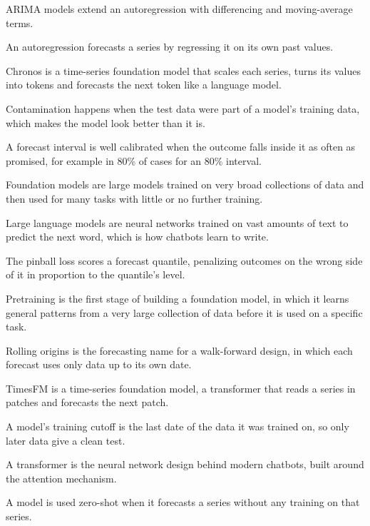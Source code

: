 \begin{keyterms}
\footnotesize
\begin{description}[leftmargin=0pt, itemsep=0pt, parsep=0pt, topsep=0pt, font=\normalfont\bfseries\color{FEMaroon}]
  \item[ARIMA.] ARIMA models extend an autoregression with differencing and moving-average terms.
  \item[Autoregression.] An autoregression forecasts a series by regressing it on its own past values.
  \item[Chronos.] Chronos is a time-series foundation model that scales each series, turns its values into tokens and forecasts the next token like a language model.
  \item[Contamination.] Contamination happens when the test data were part of a model's training data, which makes the model look better than it is.
  \item[Forecast interval calibration.] A forecast interval is well calibrated when the outcome falls inside it as often as promised, for example in 80\% of cases for an 80\% interval.
  \item[Foundation models.] Foundation models are large models trained on very broad collections of data and then used for many tasks with little or no further training.
  \item[Large language models.] Large language models are neural networks trained on vast amounts of text to predict the next word, which is how chatbots learn to write.
  \item[Pinball loss.] The pinball loss scores a forecast quantile, penalizing outcomes on the wrong side of it in proportion to the quantile's level.
  \item[Pretraining.] Pretraining is the first stage of building a foundation model, in which it learns general patterns from a very large collection of data before it is used on a specific task.
  \item[Rolling origins.] Rolling origins is the forecasting name for a walk-forward design, in which each forecast uses only data up to its own date.
  \item[TimesFM.] TimesFM is a time-series foundation model, a transformer that reads a series in patches and forecasts the next patch.
  \item[Training cutoff.] A model's training cutoff is the last date of the data it was trained on, so only later data give a clean test.
  \item[Transformer.] A transformer is the neural network design behind modern chatbots, built around the attention mechanism.
  \item[Zero-shot.] A model is used zero-shot when it forecasts a series without any training on that series.
\end{description}
\end{keyterms}

